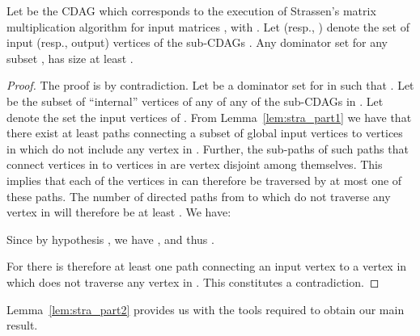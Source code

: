 \documentclass[a4paper,UKenglish]{lipics-v2016}
\begin{document}
\begin{lemma}\label{lem:stra_part2}
Let  be the CDAG which corresponds to the execution of Strassen's matrix multiplication algorithm for input matrices , with . Let  (resp., ) denote the set of input (resp., output) vertices of the  sub-CDAGs . Any dominator set for any subset , has size at least .
\end{lemma}
\begin{proof}
	The proof is by contradiction. Let  be a dominator set for  in  such that . 
	Let  be the subset of ``internal'' vertices of any of any of the sub-CDAGs  in .	Let  denote the set the input vertices of . From Lemma~\ref{lem:stra_part1} we have that there exist at least   paths connecting a subset  of global input vertices to vertices in  which do not include any vertex in . Further, the sub-paths of such paths that connect vertices in  to vertices in  are vertex disjoint among themselves. This implies that each of the vertices in   can therefore be traversed by at most one of these paths. The number of directed paths from  to  which do not traverse any vertex in  will therefore be at least . We have:

Since by hypothesis , we have ,
and thus .

For  there is therefore at least one path connecting an input vertex to a vertex in  which does not traverse any vertex in . This constitutes a contradiction.
\end{proof}

Lemma~\ref{lem:stra_part2} provides us with the tools required to obtain our main result. 
\end{document}
